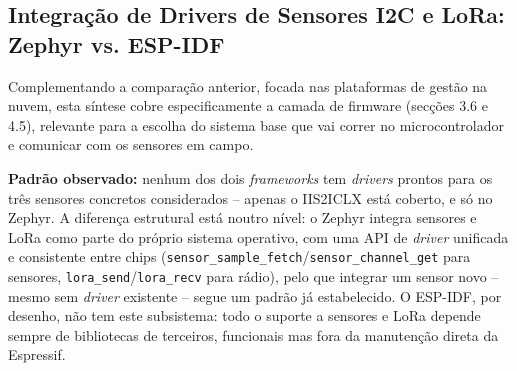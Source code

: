 \documentclass[a4paper,12pt]{article}
\begin{document}
\subsection{Integração de Drivers de Sensores I2C e LoRa: Zephyr vs. ESP-IDF}
Complementando a comparação anterior, focada nas plataformas de gestão na nuvem, esta síntese cobre especificamente a camada de firmware (secções 3.6 e 4.5), relevante para a escolha do sistema base que vai correr no microcontrolador e comunicar com os sensores em campo.

\begin{center}
\end{center}

\textbf{Padrão observado:} nenhum dos dois \textit{frameworks} tem \textit{drivers} prontos para os três sensores concretos considerados -- apenas o IIS2ICLX está coberto, e só no Zephyr. A diferença estrutural está noutro nível: o Zephyr integra sensores e LoRa como parte do próprio sistema operativo, com uma API de \textit{driver} unificada e consistente entre chips (\texttt{sensor\_sample\_fetch}/\texttt{sensor\_channel\_get} para sensores, \texttt{lora\_send}/\texttt{lora\_recv} para rádio), pelo que integrar um sensor novo -- mesmo sem \textit{driver} existente -- segue um padrão já estabelecido. O ESP-IDF, por desenho, não tem este subsistema: todo o suporte a sensores e LoRa depende sempre de bibliotecas de terceiros, funcionais mas fora da manutenção direta da Espressif.
\end{document}
